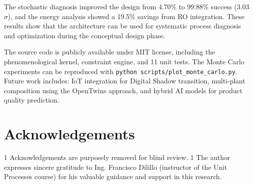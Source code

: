 \documentclass[10pt]{article}
\def\blind{1}
\begin{document}
The stochastic diagnosis improved the design from 4.70\% to 99.88\% success (3.03$\sigma$), and the energy analysis showed a 19.5\% savings from RO integration. These results show that the architecture can be used for systematic process diagnosis and optimization during the conceptual design phase.

The source code is publicly available under MIT license, including the phenomenological kernel, constraint engine, and 11 unit tests. The Monte Carlo experiments can be reproduced with \texttt{python scripts/plot\_monte\_carlo.py}. Future work includes: IoT integration for Digital Shadow transition, multi-plant composition using the OpenTwins approach, and hybrid AI models for product quality prediction.

\section*{Acknowledgements}
\blind
Acknowledgements are purposely removed for blind review.
\fi
{}\blind
The author expresses sincere gratitude to Ing. Francisco Dilillo (instructor of the Unit Processes course) for his valuable guidance and support in this research.
\fi



\end{document}
